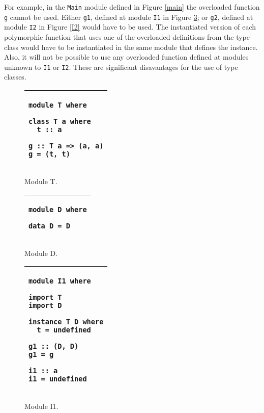 \documentclass[msc]{ppgccufmg}
\begin{document}
For example, in the \texttt{Main} module defined
in Figure \ref{main} the overloaded function \texttt{g} cannot be used.  Either
\texttt{g1}, defined at module \texttt{I1} in Figure \ref{I1}; or \texttt{g2},
defined at module \texttt{I2} in Figure \ref{I2} would have to be used.  The
instantiated version of each polymorphic function that uses one of the overloaded
definitions from the type class would have to be instantiated in the same module
that defines the instance.  Also, it will not be possible to use any overloaded
function defined at modules unknown to \texttt{I1} or \texttt{I2}.  These are significant disavantages for the use of type classes.

\begin{figure}
\caption{Module T.\label{T}}
\begin{tabular}{|p{\textwidth}|}
\hline
\begin{verbatim}
module T where

class T a where
  t :: a

g :: T a => (a, a)
g = (t, t)
\end{verbatim}
\\
\hline
\end{tabular}
\end{figure}

\begin{figure}
\caption{Module D.\label{D}}
\begin{tabular}{|p{\textwidth}|}
\hline
\begin{verbatim}
module D where

data D = D
\end{verbatim}
\\
\hline
\end{tabular}
\end{figure}

\begin{figure}
\caption{Module I1.\label{I1}}
\begin{tabular}{|p{\textwidth}|}
\hline
\begin{verbatim}
module I1 where

import T
import D

instance T D where
  t = undefined

g1 :: (D, D)
g1 = g

i1 :: a
i1 = undefined
\end{verbatim}
\\
\hline
\end{tabular}
\end{figure}
\end{document}
